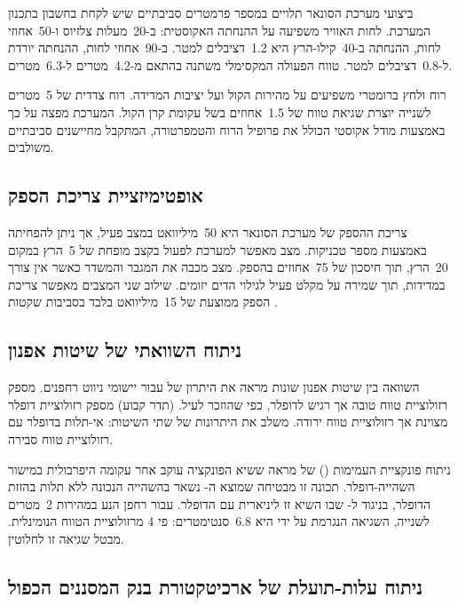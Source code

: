 ביצועי מערכת הסונאר תלויים במספר פרמטרים סביבתיים שיש לקחת בחשבון בתכנון המערכת. לחות האוויר משפיעה על ההנחתה האקוסטית: ב-20~מעלות צלזיוס ו-50~אחוזי לחות, ההנחתה ב-40~קילו-הרץ היא 1.2~דציבלים למטר. ב-90~אחוזי לחות, ההנחתה יורדת ל-0.8~דציבלים למטר. טווח הפעולה המקסימלי משתנה בהתאם מ-4.2~מטרים ל-6.3~מטרים.

רוח ולחץ ברומטרי משפיעים על מהירות הקול ועל יציבות המדידה. רוח צדדית של 5~מטרים לשנייה יוצרת שגיאת טווח של 1.5~אחוזים בשל עקומת קרן הקול. המערכת מפצה על כך באמצעות מודל אקוסטי הכולל את פרופיל הרוח והטמפרטורה, המתקבל מחיישנים סביבתיים משולבים.

\subsection{אופטימיזציית צריכת הספק}
\label{sec:power_optimization}

צריכת ההספק של מערכת הסונאר היא 50~מיליוואט במצב פעיל, אך ניתן להפחיתה באמצעות מספר טכניקות. מצב  מאפשר למערכת לפעול בקצב מופחת של 5~הרץ במקום 20~הרץ, תוך חיסכון של 75~אחוזים בהספק. מצב  מכבה את המגבר והמשדר כאשר אין צורך במדידות, תוך שמירה על מקלט פעיל לגילוי הדים יזומים. שילוב שני המצבים מאפשר צריכת הספק ממוצעת של 15~מיליוואט בלבד בסביבות שקטות \cite{Chen2020BioSonar, CrewAIDocs}.

\subsection{ניתוח השוואתי של שיטות אפנון}
\label{sec:modulation_comparison}

השוואה בין שיטות אפנון שונות מראה את היתרון של  עבור יישומי ניווט רחפנים.  מספק רזולוציית טווח טובה אך רגיש לדופלר, כפי שהוזכר לעיל.  (תדר קבוע) מספק רזולוציית דופלר מצוינת אך רזולוציית טווח ירודה.  משלב את היתרונות של שתי השיטות: אי-תלות בדופלר עם רזולוציית טווח סבירה.

ניתוח פונקציית העמימות () של  מראה ששיא הפונקציה עוקב אחר עקומה היפרבולית במישור השהייה-דופלר. תכונה זו מבטיחה שמוצא ה- נשאר בהשהייה הנכונה ללא תלות בהזזת הדופלר, בניגוד ל- שבו השיא זז ליניארית עם הדופלר. עבור רחפן הנע במהירות 2~מטרים לשנייה, השגיאה הנגרמת על ידי  היא 6.8~סנטימטרים: פי 4 מרזולוציית הטווח הנומינלית.  מבטל שגיאה זו לחלוטין.

\subsection{ניתוח עלות-תועלת של ארכיטקטורת בנק המסננים הכפול}
\label{sec:dual_filter_cost}

